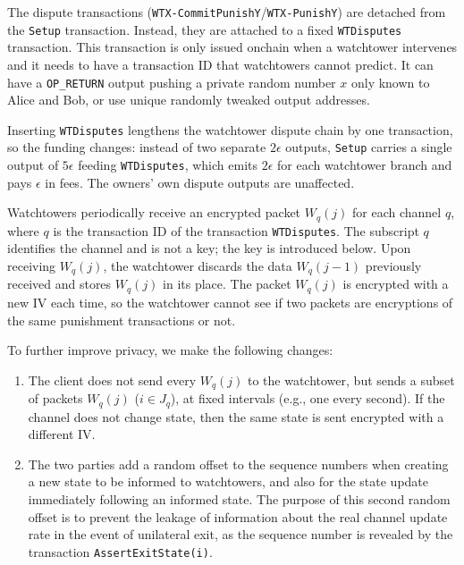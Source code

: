\documentclass[11pt,a4paper]{article}
\newcommand{\txname}[1]{\texttt{#1}}
\begin{document}
The dispute transactions (\txname{WTX-CommitPunishY}/\txname{WTX-PunishY}) are detached from the \txname{Setup} transaction. Instead, they are attached to a fixed \txname{WTDisputes} transaction. This transaction is only issued onchain when a watchtower intervenes and it needs to have a transaction ID that watchtowers cannot predict. It can have a \txname{OP\_RETURN} output pushing a private random number $x$ only known to Alice and Bob, or use unique randomly tweaked output addresses.

Inserting \txname{WTDisputes} lengthens the watchtower dispute chain by one transaction, so the funding changes: instead of two separate $2\epsilon$ outputs, \txname{Setup} carries a single output of $5\epsilon$ feeding \txname{WTDisputes}, which emits $2\epsilon$ for each watchtower branch and pays $\epsilon$ in fees. The owners' own dispute outputs are unaffected.

Watchtowers periodically receive an encrypted packet $W_q(j)$ for each channel $q$, where $q$ is the transaction ID of the transaction \txname{WTDisputes}. The subscript $q$ identifies the channel and is not a key; the key is introduced below. Upon receiving $W_q(j)$, the watchtower discards the data $W_q(j-1)$ previously received and stores $W_q(j)$ in its place. The packet $W_q(j)$ is encrypted with a new IV each time, so the watchtower cannot see if two packets are encryptions of the same punishment transactions or not. 

To further improve privacy, we make the following changes:

\begin{enumerate}
   
\item  The client does not send every $W_q(j)$ to the watchtower, but sends a subset of packets $W_q(j)$ ($i \in J_q$),  at fixed intervals (e.g., one every second). If the channel does not change state, then the same state is sent encrypted with a different IV.  

\item The two parties add a random offset to the sequence numbers when creating a new state to be informed to watchtowers, and also for the state update immediately following an informed state. The purpose of this second random offset is to prevent the leakage of information about the real channel update rate in the event of unilateral exit, as the sequence number is revealed by the transaction \txname{AssertExitState(i)}. 

\end{enumerate}
\end{document}
